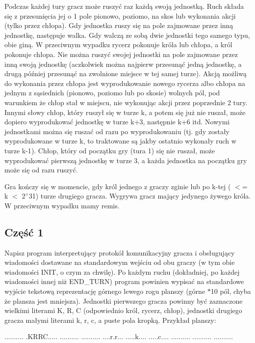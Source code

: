 Podczas każdej tury gracz może ruszyć raz każdą swoją jednostką. Ruch składa się z przesunięcia jej o 1 pole pionowo, poziomo, na skos lub wykonania akcji (tylko przez chłopa). Gdy jednostka ruszy się na pole zajmowane przez inną jednostkę, następuje walka. Gdy walczą ze sobą dwie jednostki tego samego typu, obie giną. W przeciwnym wypadku rycerz pokonuje króla lub chłopa, a król pokonuje chłopa. Nie można ruszyć swojej jednostki na pole zajmowane przez inną swoją jednostkę (aczkolwiek można najpierw przesunąć jedną jednostkę, a drugą później przesunąć na zwolnione miejsce w tej samej turze). Akcją możliwą do wykonania przez chłopa jest wyprodukowanie nowego rycerza albo chłopa na jednym z sąsiednich (pionowo, poziomo lub po skosie) wolnych pól, pod warunkiem że chłop stał w miejscu, nie wykonując akcji przez poprzednie 2 tury. Innymi słowy chłop, który ruszył się w turze {\ttfamily k}, a potem się już nie ruszał, może dopiero wyprodukować jednostkę w turze {\ttfamily k+3}, następnie {\ttfamily k+6} itd. Nowymi jednostkami można się ruszać od razu po wyprodukowaniu (tj. gdy zostały wyprodukowane w turze {\ttfamily k}, to traktowane są jakby ostatnio wykonały ruch w turze {\ttfamily k-\/1}). Chłop, który od początku gry (tura 1) się nie ruszał, może wyprodukować pierwszą jednostkę w turze 3, a każda jednostka na początku gry może się od razu ruszyć.

Gra kończy się w momencie, gdy król jednego z graczy zginie lub po {\ttfamily k}-\/tej ({ $<$= k $<$ 2$^\wedge$31}) turze drugiego gracza. Wygrywa gracz mający jedynego żywego króla. W przeciwnym wypadku mamy remis.

\subsection*{Część 1}

Napisz program interpretujący protokół komunikacyjny gracza i obsługujący wiadomości dostawane na standardowym wejściu od obu graczy (w tym obie wiadomości {\ttfamily I\-N\-I\-T}, o czym za chwilę). Po każdym ruchu (dokładniej, po każdej wiadomości innej niż {\ttfamily E\-N\-D\-\_\-\-T\-U\-R\-N}) program powinien wypisać na standardowe wyjście tekstową reprezentację górnego lewego rogu planszy (górne {$\ast$10} pól, chyba że plansza jest mniejsza). Jednostki pierwszego gracza powinny być zaznaczone wielkimi literami {\ttfamily K}, {\ttfamily R}, {\ttfamily C} (odpowiednio król, rycerz, chłop), jednostki drugiego gracza małymi literami {\ttfamily k}, {\ttfamily r}, {\ttfamily c}, a puste pola kropką. Przykład planszy\-: \begin{DoxyVerb}..........
.KRRC.....
..........
..........
....r.r...
.....k....
.....c....
..........
..........
..........
\end{DoxyVerb}



